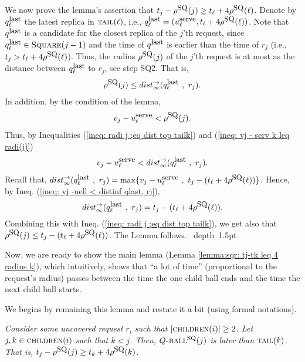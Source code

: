 \documentclass[11pt]{article}
\def\blackslug{\hbox{\hskip 1pt \vrule width 4pt height 8pt
    depth 1.5pt \hskip 1pt}}
\def\QED{\quad\blackslug\lower 8.5pt\null\par}
\newcommand{\Square}[0]{\mbox{\sc Square}}
\newcommand{\rr}{r}
\newcommand{\distinf}[1]{{dist}^{\rightarrow}_{\infty}(#1)}
\newcommand{\uSQ}{u^{\mbox{\small\upshape serve}}}
\newcommand{\tail}[0]{\mbox{\sc tail}}
\newcommand{\rhoSQ}[0]{\rho^{\mbox{\small\upshape SQ}}}
\newcommand{\suns}[0]{\mbox{\sc children}}
\newcommand{\SQball}[0]{Q{\mbox{\sc -ball}}^{\mbox{\sc sq}}}
\newcommand{\qlast}[0]{q^{\mbox{\small\upshape last}}}
\begin{document}
We now prove the lemma's assertion that $t_j-\rhoSQ(j) \geq t_\ell+4\rhoSQ(\ell)$.
Denote by $\qlast_{\ell}$ the latest replica in $\tail(\ell)$, i.e., $\qlast_{\ell}=(\uSQ_\ell,t_\ell+4\rhoSQ(\ell))$.
Note that $\qlast$ is a candidate for the closest replica of the $j$'th request, since $\qlast_\ell\in\Square(j-1)$
and the time of $\qlast$ is earlier than the time of $r_j$ (i.e., $t_j>t_\ell+4\rhoSQ(\ell)$).
Thus, the radius $\rhoSQ(j)$ of the $j$'th request is at most as the distance between $\qlast_\ell$ to $r_j$, see step SQ2.
That is,
\begin{eqnarray}
\label{ineq: radi j ;eq dist top tailk}
\rhoSQ(j)\leq \distinf{\qlast_\ell~,~r_j }.
\end{eqnarray}
In addition, by the condition of the lemma,
\begin{eqnarray}
\label{ineq: vj - serv k leq radi(j)}
v_j-\uSQ_\ell < \rhoSQ(j).
\end{eqnarray}
Thus, by Inequalities (\ref{ineq: radi j ;eq dist top tailk}) and (\ref{ineq: vj - serv k leq radi(j)})
\begin{eqnarray}
\label{ineq: vj -uell < distinf qlast, rj}
v_j-\uSQ_\ell  < \distinf{\qlast_\ell~,~r_j }.
\end{eqnarray}
Recall that, $ \distinf{\qlast_\ell~,~r_j } = \max\{ v_j-\uSQ_\ell~,~t_j-(t_\ell+4\rhoSQ(\ell))\}$.
Hence, by Ineq. (\ref{ineq: vj -uell < distinf qlast, rj}),
$$ \distinf{\qlast_\ell~,~r_j } = t_j-(t_\ell+4\rhoSQ(\ell)).$$
Combining this with Ineq. (\ref{ineq: radi j ;eq dist top tailk}), we get also that $\rhoSQ(j)\leq t_j-(t_\ell+4\rhoSQ(\ell))$.
The Lemma follows.
\QED







Now, we are ready to show the main lemma (Lemma \ref{lemma:sqr: tj-tk leq 4 radius k}), which
intuitively, shows that ``a lot of time'' (proportional to the request's radius)
passes between the time the one child ball ends and the time the next child ball starts.

We begins by remaining this lemma and restate it a bit (using formal notations).



{\em
Consider some uncovered request $\rr_i$ such that $|\suns(i)|\geq 2$.
Let $j,k\in\suns(i)$ such that $k<j$.
Then, $\SQball(j)$ is later than $\tail(k)$.
That is, $t_j-\rhoSQ(j)  \geq t_k + 4 \rhoSQ(k)$. }
\end{document}
